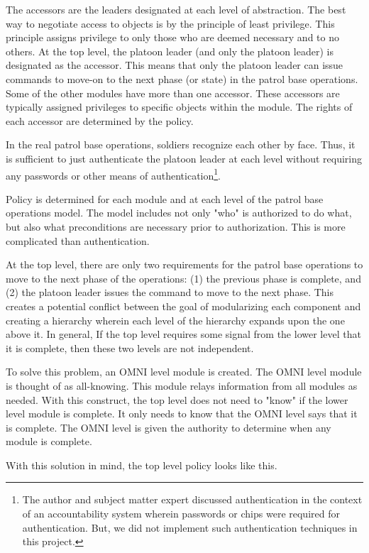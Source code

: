 \documentclass[../../main/main.tex]{subfiles}
\begin{document}
The accessors are the leaders designated at each level of abstraction.  The best way to negotiate access to objects is by the principle of least privilege.  This principle assigns privilege to only those who are deemed necessary and to no others.  At the top level, the platoon leader (and only the platoon leader) is designated as the accessor. This means that only the platoon leader can issue commands to move-on to the next phase (or state) in the patrol base operations. Some of the other modules have more than one accessor.  These accessors are typically assigned privileges to specific objects within the module.  The rights of each accessor are determined by the policy.

In the real patrol base operations, soldiers recognize each other by face.  Thus, it is sufficient to just authenticate the platoon leader at each level without requiring any passwords or other means of authentication\footnote{The author and subject matter expert discussed authentication in the context of an accountability system wherein passwords or chips were required for authentication.  But, we did not implement such authentication techniques in this project.}.

Policy is determined for each module and at each level of the patrol base operations model.  The model includes not only "who" is authorized to do what, but also what preconditions are necessary prior to authorization.  This is more complicated than authentication.

At the top level, there are only two requirements for the patrol base operations to move to the next phase of the operations: (1) the previous phase is complete, and (2) the platoon leader issues the command to move to the next phase.  This creates a potential conflict between the goal of modularizing each component and creating a hierarchy wherein each level of the hierarchy expands upon the one above it.  In general, If the top level requires some signal from the lower level that it is complete, then these two levels are not independent. 

To solve this problem, an OMNI level module is created.  The OMNI level module is thought of as all-knowing.  This module relays information from all modules as needed.  With this construct, the top level does not need to "know" if the lower level module is complete.  It only needs to know that the OMNI level says that it is complete.  The OMNI level is given the authority to determine when any module is complete.

With this solution in mind, the top level policy looks like this.
\end{document}
